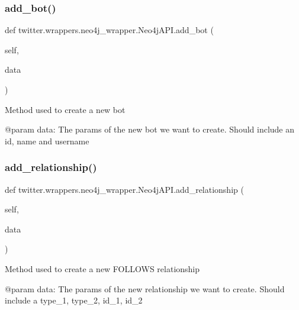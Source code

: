 \subsubsection{\texorpdfstring{add\+\_\+bot()}{add\_bot()}}
{\footnotesize\ttfamily def twitter.\+wrappers.\+neo4j\+\_\+wrapper.\+Neo4j\+A\+P\+I.\+add\+\_\+bot (\begin{DoxyParamCaption}\item[{}]{self,  }\item[{}]{data }\end{DoxyParamCaption})}

\begin{DoxyVerb}Method used to create a new bot

@param data: The params of the new bot we want to create. Should include an id, name and username
\end{DoxyVerb}
 \mbox{\label{classtwitter_1_1wrappers_1_1neo4j__wrapper_1_1Neo4jAPI_a754d17ed04106caedac79a38d0b6d6e6}} 
\subsubsection{\texorpdfstring{add\+\_\+relationship()}{add\_relationship()}}
{\footnotesize\ttfamily def twitter.\+wrappers.\+neo4j\+\_\+wrapper.\+Neo4j\+A\+P\+I.\+add\+\_\+relationship (\begin{DoxyParamCaption}\item[{}]{self,  }\item[{}]{data }\end{DoxyParamCaption})}

\begin{DoxyVerb}Method used to create a new FOLLOWS relationship

@param data: The params of the new relationship we want to create. Should include a type_1, type_2, id_1, id_2
\end{DoxyVerb}
 \mbox{\label{classtwitter_1_1wrappers_1_1neo4j__wrapper_1_1Neo4jAPI_ad165965732c986fd93cbd0dd8dd23ccc}} 
